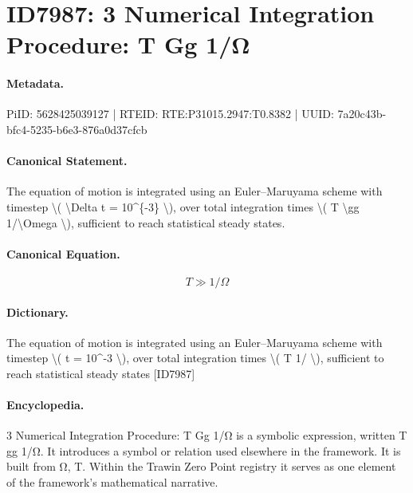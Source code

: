 \section*{ID7987: 3 Numerical Integration Procedure: T Gg 1/Ω}
\paragraph{Metadata.}
PiID: 5628425039127 | RTEID: RTE:P31015.2947:T0.8382 | UUID: 7a20c43b-bfc4-5235-b6e3-876a0d37cfcb

\paragraph{Canonical Statement.}
The equation of motion is integrated using an Euler–Maruyama scheme with timestep \textbackslash{}( \textbackslash{}Delta t = 10\textasciicircum{}\{-3\} \textbackslash{}), over total integration times \textbackslash{}( T \textbackslash{}gg 1/\textbackslash{}Omega \textbackslash{}), sufficient to reach statistical steady states.

\paragraph{Canonical Equation.}
\[
T \gg 1/\Omega
\]

\paragraph{Dictionary.}
The equation of motion is integrated using an Euler–Maruyama scheme with timestep \textbackslash{}( t = 10\textasciicircum{}-3 \textbackslash{}), over total integration times \textbackslash{}( T 1/ \textbackslash{}), sufficient to reach statistical steady states [ID7987]

\paragraph{Encyclopedia.}
3 Numerical Integration Procedure: T Gg 1/Ω is a symbolic expression, written T gg 1/Ω. It introduces a symbol or relation used elsewhere in the framework. It is built from Ω, T. Within the Trawin Zero Point registry it serves as one element of the framework's mathematical narrative.
